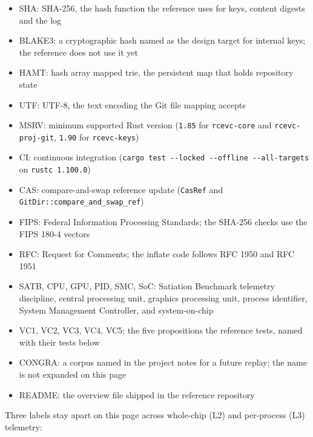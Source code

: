 \documentclass[10pt,letterpaper]{article}
\providecommand{\tightlist}{\setlength{\itemsep}{1pt}\setlength{\parskip}{0pt}}
\begin{document}
\begin{itemize}
\tightlist
\item
  SHA: SHA-256, the hash function the reference uses for keys, content
  digests and the log
\item
  BLAKE3: a cryptographic hash named as the design target for internal
  keys; the reference does not use it yet
\item
  HAMT: hash array mapped trie, the persistent map that holds repository
  state
\item
  UTF: UTF-8, the text encoding the Git file mapping accepts
\item
  MSRV: minimum supported Rust version (\texttt{1.85} for
  \texttt{rcevc-core} and \texttt{rcevc-proj-git}, \texttt{1.90} for
  \texttt{rcevc-keys})
\item
  CI: continuous integration
  (\texttt{cargo\ test\ -\allowbreak{}\/\allowbreak{}-\allowbreak{}locked\ -\allowbreak{}\/\allowbreak{}-\allowbreak{}offline\ -\allowbreak{}\/\allowbreak{}-\allowbreak{}all-\allowbreak{}targets} on
  \texttt{rustc\ 1.100.0})
\item
  CAS: compare-and-swap reference update (\texttt{CasRef} and
  \texttt{GitDir::compare\_\allowbreak{}and\_\allowbreak{}swap\_\allowbreak{}ref})
\item
  FIPS: Federal Information Processing Standards; the SHA-256 checks use
  the FIPS 180-4 vectors
\item
  RFC: Request for Comments; the inflate code follows RFC 1950 and RFC
  1951
\item
  SATB, CPU, GPU, PID, SMC, SoC: Satiation Benchmark telemetry
  discipline, central processing unit, graphics processing unit, process
  identifier, System Management Controller, and system-on-chip
\item
  VC1, VC2, VC3, VC4, VC5: the five propositions the reference tests,
  named with their tests below
\item
  CONGRA: a corpus named in the project notes for a future replay; the
  name is not expanded on this page
\item
  README: the overview file shipped in the reference repository
\end{itemize}

Three labels stay apart on this page across whole-chip (L2) and
per-process (L3) telemetry:
\end{document}
